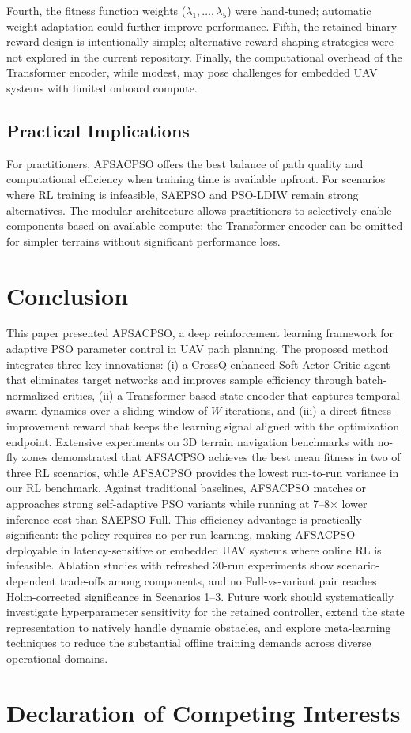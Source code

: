 \documentclass[final,5p,times]{elsarticle}
\newcommand{\symWindowsize}{W}
\begin{document}
\begin{table}[t]
{Fourth, the fitness function weights ($\lambda_1, \ldots, \lambda_5$) were hand-tuned; automatic weight adaptation could further improve performance.
Fifth, the retained binary reward design is intentionally simple; alternative reward-shaping strategies were not explored in the current repository.
Finally, the computational overhead of the Transformer encoder, while modest, may pose challenges for embedded UAV systems with limited onboard compute. \subsection{Practical Implications} For practitioners, AFSACPSO offers the best balance of path quality and computational efficiency when training time is available upfront.
For scenarios where RL training is infeasible, SAEPSO and PSO-LDIW remain strong alternatives.
The modular architecture allows practitioners to selectively enable components based on available compute: the Transformer encoder can be omitted for simpler terrains without significant performance loss. \section{Conclusion}
\label{sec:conclusion} This paper presented AFSACPSO, a deep reinforcement learning framework for adaptive PSO parameter control in UAV path planning.
The proposed method integrates three key innovations: (i) a CrossQ-enhanced Soft Actor-Critic agent \cite{Bhatt2024CrossQ} that eliminates target networks and improves sample efficiency through batch-normalized critics, (ii) a Transformer-based state encoder \cite{Vaswani2017Attention} that captures temporal swarm dynamics over a sliding window of $\symWindowsize$ iterations, and (iii) a direct fitness-improvement reward that keeps the learning signal aligned with the optimization endpoint. Extensive experiments on 3D terrain navigation benchmarks with no-fly zones demonstrated that AFSACPSO achieves the best mean fitness in two of three RL scenarios, while AFSACPSO provides the lowest run-to-run variance in our RL benchmark.
Against traditional baselines, AFSACPSO matches or approaches strong self-adaptive PSO variants while running at 7--8$\times$ lower inference cost than SAEPSO Full.
This efficiency advantage is practically significant: the policy requires no per-run learning, making AFSACPSO deployable in latency-sensitive or embedded UAV systems where online RL is infeasible.
Ablation studies with refreshed 30-run experiments show scenario-dependent trade-offs among components, and no Full-vs-variant pair reaches Holm-corrected significance in Scenarios 1--3. Future work should systematically investigate hyperparameter sensitivity for the retained controller, extend the state representation to natively handle dynamic obstacles, and explore meta-learning techniques to reduce the substantial offline training demands across diverse operational domains. \section*{Declaration of Competing Interests}
}
\end{table}
\end{document}
